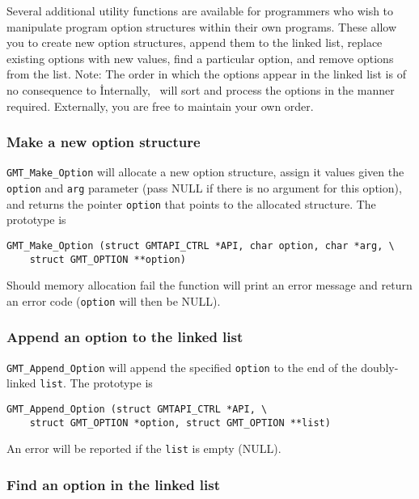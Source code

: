 \documentclass{report}
\begin{document}
Several additional utility functions are available for programmers who wish to manipulate
program option structures within their own programs.  These allow you to create new
option structures, append them to the linked list, replace existing options with new
values, find a particular option, and remove options from the list.  Note: The
order in which the options appear in the linked list is of no consequence to \GMT\.
Internally, \GMT\ will sort and process the options in the manner required.
Externally, you are free to maintain your own order.

\subsubsection{Make a new option structure}

\texttt{GMT\_Make\_Option} will allocate a new option structure, assign it values
given the \texttt{option} and \texttt{arg} parameter (pass NULL if there is no
argument for this option), and returns the pointer \texttt{option} that points
to the allocated structure.  The prototype is

\begin{verbatim}
GMT_Make_Option (struct GMTAPI_CTRL *API, char option, char *arg, \
    struct GMT_OPTION **option)
\end{verbatim}
Should memory allocation fail the function will print an error message
and return an error code (\texttt{option} will then be NULL).

\subsubsection{Append an option to the linked list}

\texttt{GMT\_Append\_Option} will append the specified \texttt{option} to the end
of the doubly-linked \texttt{list}.  The prototype is

\begin{verbatim}
GMT_Append_Option (struct GMTAPI_CTRL *API, \
    struct GMT_OPTION *option, struct GMT_OPTION **list)
\end{verbatim}
An error will be reported if the \texttt{list} is empty (NULL).

\subsubsection{Find an option in the linked list}
\index{Option!Find}
\end{document}
